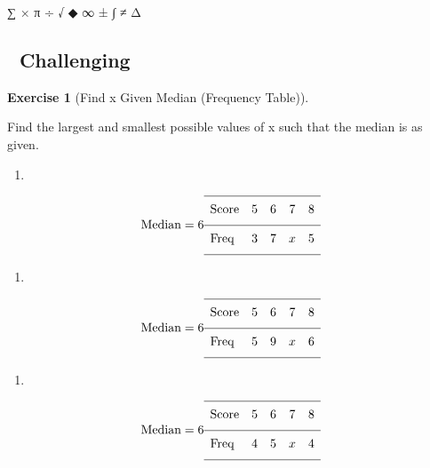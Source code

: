 \documentclass[
  letterpaper,
  DIV=11,
  numbers=noendperiod]{scrreprt}
\providecommand{\tightlist}{%
  \setlength{\itemsep}{0pt}\setlength{\parskip}{0pt}}
\theoremstyle{definition}
\newtheorem{exercise}{Exercise}[chapter]
\theoremstyle{remark}
\begin{document}
∑ × π ÷ √ ◆ ∞ ± ∫ ≠ Δ

\subsection{🔴 Challenging}

\begin{exercise}[Find x Given Median (Frequency
Table)]\protect\hypertarget{exr-freq-5}{}\label{exr-freq-5}

Find the largest and smallest possible values of x such that the median
is as given.

\begin{enumerate}
\def\labelenumi{\alph{enumi})}
\tightlist
\item
\end{enumerate}

\[\text{Median} = 6\\[6pt]{\renewcommand{\arraystretch}{1.6}\begin{array}{lcccc}
\hline \text{Score} & 5 & 6 & 7 & 8 \\[4pt]
\hline \text{Freq} & 3 & 7 & x & 5 \\[4pt]
\hline
\end{array}}\]

\begin{enumerate}
\def\labelenumi{\alph{enumi})}
\setcounter{enumi}{1}
\tightlist
\item
\end{enumerate}

\[\text{Median} = 6\\[6pt]{\renewcommand{\arraystretch}{1.6}\begin{array}{lcccc}
\hline \text{Score} & 5 & 6 & 7 & 8 \\[4pt]
\hline \text{Freq} & 5 & 9 & x & 6 \\[4pt]
\hline
\end{array}}\]

\begin{enumerate}
\def\labelenumi{\alph{enumi})}
\setcounter{enumi}{2}
\tightlist
\item
\end{enumerate}

\[\text{Median} = 6\\[6pt]{\renewcommand{\arraystretch}{1.6}\begin{array}{lcccc}
\hline \text{Score} & 5 & 6 & 7 & 8 \\[4pt]
\hline \text{Freq} & 4 & 5 & x & 4 \\[4pt]
\hline
\end{array}}\]


\end{exercise}
\end{document}

